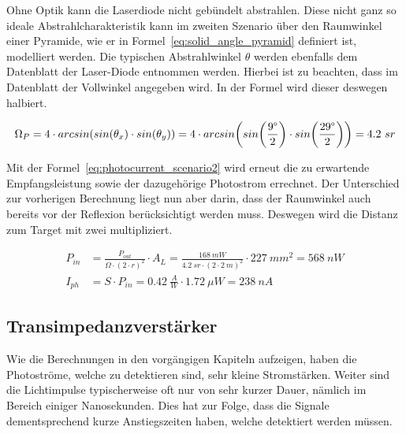 Ohne Optik kann die Laserdiode nicht gebündelt abstrahlen. Diese nicht ganz so ideale Abstrahlcharakteristik kann im
zweiten Szenario über den Raumwinkel einer Pyramide, wie er in Formel~\ref{eq:solid_angle_pyramid} definiert ist,
modelliert werden. Die typischen Abstrahlwinkel $\theta$ werden ebenfalls dem Datenblatt der Laser-Diode
entnommen werden. Hierbei ist zu beachten, dass im Datenblatt der Vollwinkel angegeben wird. In der Formel wird dieser
deswegen halbiert.

\begin{equation}\label{eq:solid_angle_pyramid}
    \Omega_{P} = 4 \cdot arcsin(sin(\theta_x) \cdot sin(\theta_y)) =  4 \cdot arcsin \parenth*{sin \parenth*{\frac{9\degree}{2}} \cdot sin \parenth*{\frac{29\degree}{2}}} = 4.2~sr
\end{equation}

Mit der Formel~\ref{eq:photocurrent_scenario2} wird erneut die zu erwartende Empfangsleistung sowie der dazugehörige
Photostrom errechnet. Der Unterschied zur vorherigen Berechnung liegt nun aber darin, dass der Raumwinkel auch bereits
vor der Reflexion berücksichtigt werden muss. Deswegen wird die Distanz zum Target mit zwei multipliziert.

\begin{equation}\label{eq:photocurrent_scenario2}
    \begin{split}
        P_{in} &= \frac{P_{out}}{\Omega \cdot (2 \cdot r)^2} \cdot A_{L} = \frac{168~mW}{4.2~sr \cdot (2 \cdot 2~m)^2} \cdot 227~mm^2 = 568~nW\\
        I_{ph} &= S \cdot P_{in} = 0.42~\frac{A}{W} \cdot 1.72~\mu W = 238~nA
    \end{split}
\end{equation}

\pagebreak

\subsection{Transimpedanzverstärker}

Wie die Berechnungen in den vorgängigen Kapiteln aufzeigen, haben die Photoströme, welche zu detektieren sind, sehr kleine
Stromstärken. Weiter sind die Lichtimpulse typischerweise oft nur von sehr kurzer Dauer, nämlich im Bereich einiger Nanosekunden.
Dies hat zur Folge, dass die Signale dementsprechend kurze Anstiegszeiten haben, welche detektiert werden müssen.


